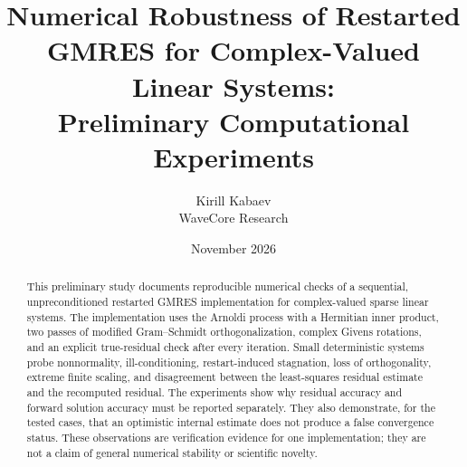 \documentclass[11pt,a4paper]{article}
\title{Numerical Robustness of Restarted GMRES for Complex-Valued Linear Systems:\\
Preliminary Computational Experiments}
\author{Kirill Kabaev\\WaveCore Research}
\date{November 2026}
\begin{document}
\maketitle

\begin{abstract}
This preliminary study documents reproducible numerical checks of a sequential,
unpreconditioned restarted GMRES implementation for complex-valued sparse linear
systems. The implementation uses the Arnoldi process with a Hermitian inner
product, two passes of modified Gram--Schmidt orthogonalization, complex Givens
rotations, and an explicit true-residual check after every iteration. Small
deterministic systems probe nonnormality, ill-conditioning, restart-induced
stagnation, loss of orthogonality, extreme finite scaling, and disagreement
between the least-squares residual estimate and the recomputed residual. The
experiments show why residual accuracy and forward solution accuracy must be
reported separately. They also demonstrate, for the tested cases, that an
optimistic internal estimate does not produce a false convergence status. These
observations are verification evidence for one implementation; they are not a
claim of general numerical stability or scientific novelty.
\end{abstract}









\printbibliography
\end{document}

